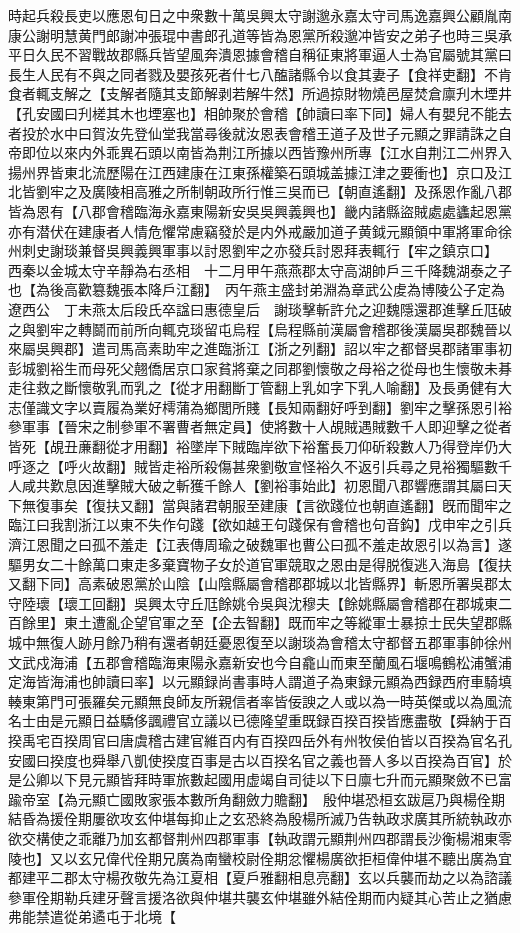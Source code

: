 時起兵殺長吏以應恩旬日之中衆數十萬吳興太守謝邈永嘉太守司馬逸嘉興公顧胤南康公謝明慧黄門郎謝冲張琨中書郎孔道等皆為恩黨所殺邈冲皆安之弟子也時三吳承平日久民不習戰故郡縣兵皆望風奔潰恩據會稽自稱征東將軍逼人士為官屬號其黨曰長生人民有不與之同者戮及嬰孩死者什七八醢諸縣令以食其妻子【食祥吏翻】不肯食者輒支解之【支解者隨其支節解剥若解牛然】所過掠財物燒邑屋焚倉廪刋木堙井【孔安國曰刋槎其木也堙塞也】相帥聚於會稽【帥讀曰率下同】婦人有嬰兒不能去者投於水中曰賀汝先登仙堂我當尋後就汝恩表會稽王道子及世子元顯之罪請誅之自帝即位以來内外乖異石頭以南皆為荆江所據以西皆豫州所專【江水自荆江二州界入揚州界皆東北流歷陽在江西建康在江東孫權築石頭城盖據江津之要衝也】京口及江北皆劉牢之及廣陵相高雅之所制朝政所行惟三吳而已【朝直遙翻】及孫恩作亂八郡皆為恩有【八郡會稽臨海永嘉東陽新安吳吳興義興也】畿内諸縣盜賊處處蠭起恩黨亦有潜伏在建康者人情危懼常慮竊發於是内外戒嚴加道子黄鉞元顯領中軍將軍命徐州刺史謝琰兼督吳興義興軍事以討恩劉牢之亦發兵討恩拜表輒行【牢之鎮京口】　西秦以金城太守辛靜為右丞相　十二月甲午燕燕郡太守高湖帥戶三千降魏湖泰之子也【為後高歡簒魏張本降戶江翻】　丙午燕主盛封弟淵為章武公䖍為博陵公子定為遼西公　丁未燕太后段氏卒諡曰惠德皇后　謝琰擊斬許允之迎魏隱還郡進擊丘尫破之與劉牢之轉鬬而前所向輒克琰留屯烏程【烏程縣前漢屬會稽郡後漢屬吳郡魏晉以來屬吳興郡】遣司馬高素助牢之進臨浙江【浙之列翻】詔以牢之都督吳郡諸軍事初彭城劉裕生而母死父翹僑居京口家貧將棄之同郡劉懷敬之母裕之從母也生懷敬未朞走往救之斷懷敬乳而乳之【從才用翻斷丁管翻上乳如字下乳人喻翻】及長勇健有大志僅識文字以賣履為業好樗蒲為鄉閭所賤【長知兩翻好呼到翻】劉牢之擊孫恩引裕參軍事【晉宋之制參軍不署曹者無定員】使將數十人覘賊遇賊數千人即迎擊之從者皆死【覘丑亷翻從才用翻】裕墜岸下賊臨岸欲下裕奮長刀仰斫殺數人乃得登岸仍大呼逐之【呼火故翻】賊皆走裕所殺傷甚衆劉敬宣怪裕久不返引兵尋之見裕獨驅數千人咸共歎息因進擊賊大破之斬獲千餘人【劉裕事始此】初恩聞八郡響應謂其屬曰天下無復事矣【復扶又翻】當與諸君朝服至建康【言欲踐位也朝直遙翻】旣而聞牢之臨江曰我割浙江以東不失作句踐【欲如越王句踐保有會稽也句音鈎】戊申牢之引兵濟江恩聞之曰孤不羞走【江表傳周瑜之破魏軍也曹公曰孤不羞走故恩引以為言】遂驅男女二十餘萬口東走多棄寶物子女於道官軍競取之恩由是得脱復逃入海島【復扶又翻下同】高素破恩黨於山陰【山陰縣屬會稽郡郡城以北皆縣界】斬恩所署吳郡太守陸瓌【瓌工回翻】吳興太守丘尫餘姚令吳與沈穆夫【餘姚縣屬會稽郡在郡城東二百餘里】東土遭亂企望官軍之至【企去智翻】既而牢之等縱軍士暴掠士民失望郡縣城中無復人跡月餘乃稍有還者朝廷憂恩復至以謝琰為會稽太守都督五郡軍事帥徐州文武戍海浦【五郡會稽臨海東陽永嘉新安也今自龕山而東至蘭風石堰鳴鶴松浦蟹浦定海皆海浦也帥讀曰率】以元顯録尚書事時人謂道子為東録元顯為西録西府車騎填輳東第門可張羅矣元顯無良師友所親信者率皆佞諛之人或以為一時英傑或以為風流名士由是元顯日益驕侈諷禮官立議以已德隆望重既録百揆百揆皆應盡敬【舜納于百揆禹宅百揆周官曰唐虞稽古建官維百内有百揆四岳外有州牧侯伯皆以百揆為官名孔安國曰揆度也舜舉八凱使揆度百事是古以百揆名官之義也晉人多以百揆為百官】於是公卿以下見元顯皆拜時軍旅數起國用虚竭自司徒以下日廪七升而元顯聚斂不已富踰帝室【為元顯亡國敗家張本數所角翻斂力贍翻】　殷仲堪恐桓玄跋扈乃與楊佺期結昏為援佺期屢欲攻玄仲堪每抑止之玄恐終為殷楊所滅乃告執政求廣其所統執政亦欲交構使之乖離乃加玄都督荆州四郡軍事【執政謂元顯荆州四郡謂長沙衡楊湘東零陵也】又以玄兄偉代佺期兄廣為南蠻校尉佺期忿懼楊廣欲拒桓偉仲堪不聽出廣為宜都建平二郡太守楊孜敬先為江夏相【夏戶雅翻相息亮翻】玄以兵襲而劫之以為諮議參軍佺期勒兵建牙聲言援洛欲與仲堪共襲玄仲堪雖外結佺期而内疑其心苦止之猶慮弗能禁遣從弟遹屯于北境【
